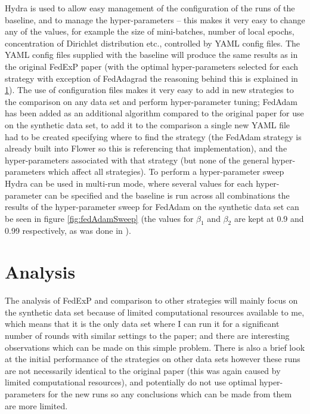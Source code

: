 \documentclass{article}
\begin{document}
Hydra is used to allow easy management of the configuration of the runs of the baseline, and to manage the hyper-parameters -- this makes it very easy to change any of the values, for example the size of mini-batches, number of local epochs, concentration of Dirichlet distribution etc., controlled by YAML config files.  The YAML config files supplied with the baseline will produce the same results as in the original FedExP paper (with the optimal hyper-parameters selected for each strategy with exception of FedAdagrad the reasoning behind this is explained in \ref{Analysis}).  The use of configuration files makes it very easy to add in new strategies to the comparison on any data set and perform hyper-parameter tuning; FedAdam has been added as an additional algorithm compared to the original paper for use on the synthetic data set, to add it to the comparison a single new YAML file had to be created specifying where to find the strategy (the FedAdam strategy is already built into Flower so this is referencing that implementation), and the hyper-parameters associated with that strategy (but none of the general hyper-parameters which affect all strategies).  To perform a hyper-parameter sweep Hydra can be used in multi-run mode, where several values for each hyper-parameter can be specified and the baseline is run across all combinations the results of the hyper-parameter sweep for FedAdam on the synthetic data set can be seen in figure \ref{fig:fedAdamSweep} (the values for $\beta_1$ and $\beta_2$ are kept at 0.9 and 0.99 respectively, as was done in \cite{AdaptiveFederatedOptimisation}).

\section{Analysis}
\label{Analysis}

The analysis of FedExP and comparison to other strategies will mainly focus on the synthetic data set because of limited computational resources available to me, which means that it is the only data set where I can run it for a significant number of rounds with similar settings to the paper; and there are interesting observations which can be made on this simple problem.  There is also a brief look at the initial performance of the strategies on other data sets however these runs are not necessarily identical to the original paper (this was again caused by limited computational resources), and potentially do not use optimal hyper-parameters for the new runs so any conclusions which can be made from them are more limited.
\end{document}
